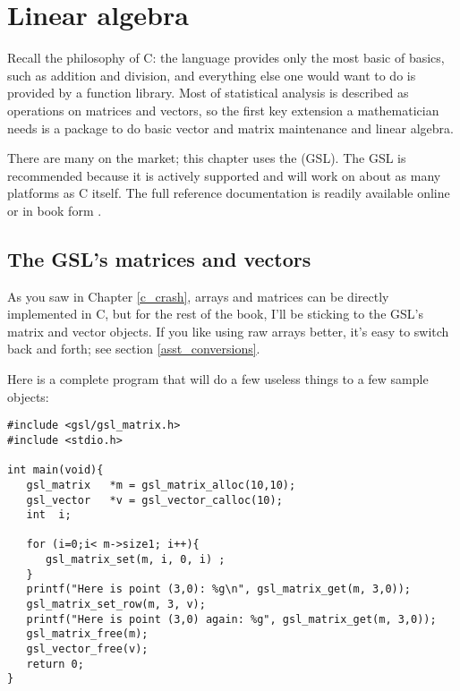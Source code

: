 \chapter[Linear Algebra]{Linear algebra} \label{linear_algebra} 

Recall the philosophy of C: the language provides only the most basic of
basics, such as addition and division, and everything else one would
want to do is provided by a function library. Most of statistical analysis is
described as operations on matrices and vectors, so the first key
extension a mathematician needs is a package to do basic vector and
matrix maintenance and linear algebra.

There are many on the market; this chapter uses the  (GSL). The GSL is recommended because it is actively supported
and will work on about as many platforms as C itself. The full reference
documentation is readily available online or in book form
\citep{gough:gsl}.

\section{The GSL's matrices and vectors}
As you saw in Chapter \ref{c_crash}, arrays and matrices can be directly implemented in C, but for
the rest of the book, I'll be sticking to the GSL's matrix and vector objects.
If you like using raw arrays better, it's easy to switch back and forth; see
section \ref{asst_conversions}.


Here is a complete program that will do a few useless things to a few sample
objects:\label{gslexample}
\begin{lstlisting}
#include <gsl/gsl_matrix.h>
#include <stdio.h>

int main(void){
   gsl_matrix   *m = gsl_matrix_alloc(10,10);
   gsl_vector   *v = gsl_vector_calloc(10);
   int  i;

   for (i=0;i< m->size1; i++){
      gsl_matrix_set(m, i, 0, i) ;
   }
   printf("Here is point (3,0): %g\n", gsl_matrix_get(m, 3,0));
   gsl_matrix_set_row(m, 3, v);
   printf("Here is point (3,0) again: %g", gsl_matrix_get(m, 3,0));
   gsl_matrix_free(m);
   gsl_vector_free(v);
   return 0;
}
\end{lstlisting}
